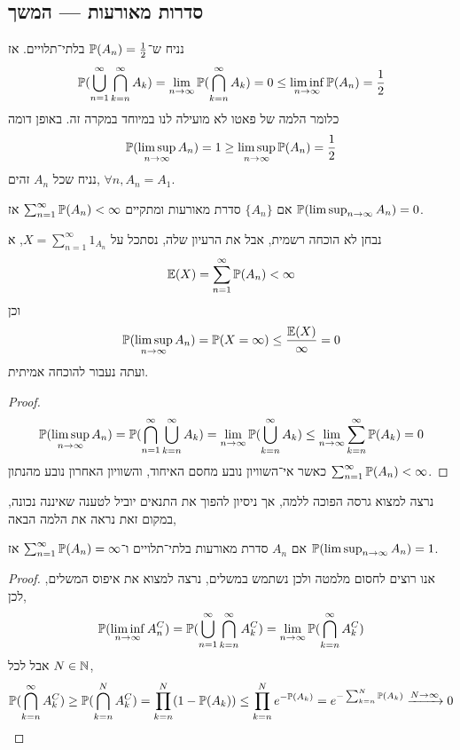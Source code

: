 \subsection{סדרות מאורעות --- המשך}
\begin{example}
	נניח ש־$\mathbb{P}(A_n) = \frac{1}{2}$ בלתי־תלויים.
	אז
	\[
		\mathbb{P}(\bigcup_{n = 1}^\infty \bigcap_{k = n}^\infty A_k)
		= \lim_{n \to \infty} \mathbb{P}(\bigcap_{k = n}^\infty A_k)
		= 0
		\le \liminf_{n \to \infty} \mathbb{P}(A_n)
		= \frac{1}{2}
	\]
	כלומר הלמה של פאטו לא מועילה לנו במיוחד במקרה זה.
	באופן דומה
	\[
		\mathbb{P}(\limsup_{n \to \infty} A_n)
		= 1 \ge \limsup_{n \to \infty} \mathbb{P}(A_n)
		= \frac{1}{2}
	\]
	נניח שכל $A_n$ זהים, $\forall n, A_n = A_1$.
\end{example}
\begin{lemma}
	אם $\{A_n\}$ סדרת מאורעות ומתקיים $\sum_{n = 1}^{\infty} \mathbb{P}(A_n) < \infty$ אז $\mathbb{P}(\limsup_{n \to \infty} A_n) = 0$.
\end{lemma}
נבחן לא הוכחה רשמית, אבל את הרעיון שלה, נסתכל על $X = \sum_{n = 1}^{\infty} 1_{A_n}$, א
\[
	\mathbb{E}(X)
	= \sum_{n = 1}^{\infty} \mathbb{P}(A_n) < \infty
\]
וכן
\[
	\mathbb{P}(\limsup_{n \to \infty} A_n)
	= \mathbb{P}(X = \infty)
	\le \frac{\mathbb{E}(X)}{\infty}
	= 0
\]
ועתה נעבור להוכחה אמיתית.
\begin{proof}
	\[
		\mathbb{P}(\limsup_{n \to \infty} A_n)
		= \mathbb{P}(\bigcap_{n = 1}^\infty \bigcup_{k = n}^\infty A_k)
		= \lim_{n \to \infty} \mathbb{P}(\bigcup_{k = n}^\infty A_k)
		\le \lim_{n \to \infty} \sum_{k = n}^{\infty} \mathbb{P}(A_k)
		= 0
	\]
	כאשר אי־השוויון נובע מחסם האיחוד, והשוויון האחרון נובע מהנתון $\sum_{n = 1}^{\infty} \mathbb{P}(A_n) < \infty$.
\end{proof}
נרצה למצוא גרסה הפוכה ללמה, אך ניסיון להפוך את התנאים יוביל לטענה שאיננה נכונה, במקום זאת נראה את הלמה הבאה,
\begin{lemma}
	אם $A_n$ סדרת מאורעות בלתי־תלויים ו־$\sum_{n = 1}^{\infty} \mathbb{P}(A_n) = \infty$ אז $\mathbb{P}(\limsup_{n \to \infty} A_n) = 1$.
\end{lemma}
\begin{proof}
	אנו רוצים לחסום מלמטה ולכן נשתמש במשלים, נרצה למצוא את איפוס המשלים, לכן,
	\[
		\mathbb{P}(\liminf_{n \to \infty} A_n^C)
		= \mathbb{P}(\bigcup_{n = 1}^\infty \bigcap_{k = n}^\infty A_k^C)
		= \lim_{n \to \infty} \mathbb{P}(\bigcap_{k = n}^\infty A_k^C)
	\]
	אבל לכל $N \in \mathbb{N}$,
	\[
		\mathbb{P}(\bigcap_{k = n}^\infty A_k^C)
		\ge \mathbb{P}(\bigcap_{k = n}^N A_k^C)
		= \prod_{k = n}^N (1 - \mathbb{P}(A_k))
		\le \prod_{k = n}^N e^{-\mathbb{P}(A_k)}
		= e^{-\sum_{k = n}^N \mathbb{P}(A_k)}
		\xrightarrow{N \to \infty} 0
	\]
\end{proof}
